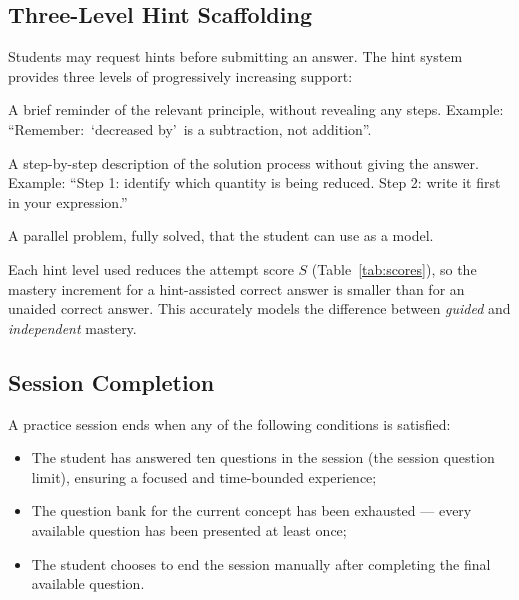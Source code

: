 \documentclass[12pt,a4paper]{article}
\begin{document}
\subsection{Three-Level Hint Scaffolding}

Students may request hints before submitting an answer.  The hint system
provides three levels of progressively increasing support:

\begin{description}[leftmargin=2em, style=nextline]
  \item[\textbf{Level 1 — Conceptual cue}]
    A brief reminder of the relevant principle, without revealing any steps.
    Example: ``Remember: \,`decreased by'\, is a subtraction, not addition''.

  \item[\textbf{Level 2 — Procedural guidance}]
    A step-by-step description of the solution process without giving the
    answer.  Example: ``Step 1: identify which quantity is being reduced.
    Step 2: write it first in your expression.''

  \item[\textbf{Level 3 — Worked example}]
    A parallel problem, fully solved, that the student can use as a model.
\end{description}

Each hint level used reduces the attempt score $S$ (Table~\ref{tab:scores}),
so the mastery increment for a hint-assisted correct answer is smaller than
for an unaided correct answer.  This accurately models the difference between
\emph{guided} and \emph{independent} mastery.

\subsection{Session Completion}

A practice session ends when any of the following conditions is satisfied:

\begin{itemize}[leftmargin=1.8em]
  \item The student has answered ten questions in the session (the session
        question limit), ensuring a focused and time-bounded experience;
  \item The question bank for the current concept has been exhausted —
        every available question has been presented at least once;
  \item The student chooses to end the session manually after completing the
        final available question.
\end{itemize}
\end{document}
